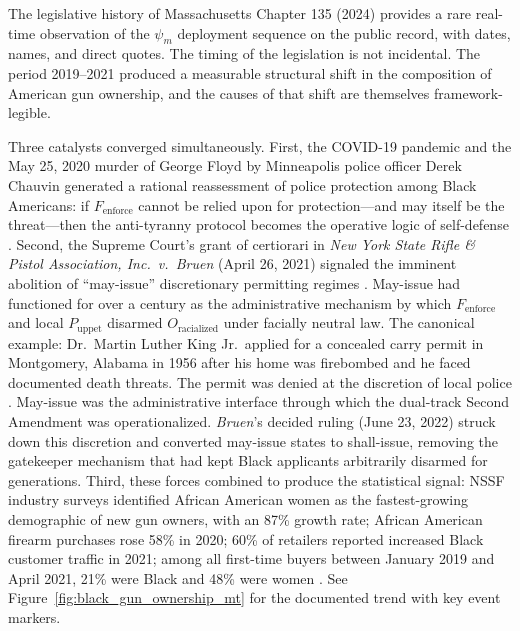 \begin{keyinsight}
The legislative history of Massachusetts Chapter 135 (2024) provides a rare real-time observation of the $\psi_m$ deployment sequence on the public record, with dates, names, and direct quotes. The timing of the legislation is not incidental. The period 2019--2021 produced a measurable structural shift in the composition of American gun ownership, and the causes of that shift are themselves framework-legible.

Three catalysts converged simultaneously. First, the COVID-19 pandemic and the May 25, 2020 murder of George Floyd by Minneapolis police officer Derek Chauvin generated a rational reassessment of police protection among Black Americans: if $F_{\text{enforce}}$ cannot be relied upon for protection---and may itself be the threat---then the anti-tyranny protocol becomes the operative logic of self-defense \cite{guardian_black_guns_2021}. Second, the Supreme Court's grant of certiorari in \textit{New York State Rifle \& Pistol Association, Inc.\ v.\ Bruen} (April 26, 2021) signaled the imminent abolition of ``may-issue'' discretionary permitting regimes \cite{bruen}. May-issue had functioned for over a century as the administrative mechanism by which $F_{\text{enforce}}$ and local $P_{\text{uppet}}$ disarmed $O_{\text{racialized}}$ under facially neutral law. The canonical example: Dr.\ Martin Luther King Jr.\ applied for a concealed carry permit in Montgomery, Alabama in 1956 after his home was firebombed and he faced documented death threats. The permit was denied at the discretion of local police \cite{mlk_permit_denied, goa_mlk_harvard}. May-issue was the administrative interface through which the dual-track Second Amendment was operationalized. \textit{Bruen}'s decided ruling (June 23, 2022) struck down this discretion and converted may-issue states to shall-issue, removing the gatekeeper mechanism that had kept Black applicants arbitrarily disarmed for generations. Third, these forces combined to produce the statistical signal: NSSF industry surveys identified African American women as the fastest-growing demographic of new gun owners, with an 87\% growth rate; African American firearm purchases rose 58\% in 2020; 60\% of retailers reported increased Black customer traffic in 2021; among all first-time buyers between January 2019 and April 2021, 21\% were Black and 48\% were women \cite{nssf_black_gun_owners_2021, nih_covid_guns_2022}. See Figure~\ref{fig:black_gun_ownership_mt} for the documented trend with key event markers.


\end{keyinsight}
